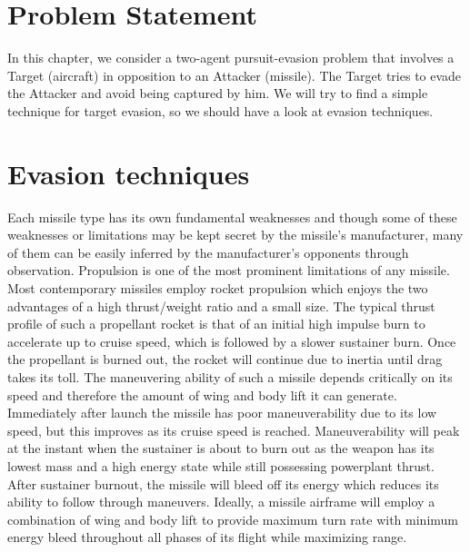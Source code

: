 \label{introTA}
\section{Problem Statement}
In this chapter, we consider a two-agent pursuit-evasion problem that involves  a Target (aircraft) in opposition to an Attacker (missile). The Target tries to evade the Attacker and avoid being captured by him. We will try to find a simple technique for target evasion, so we should have a look at evasion techniques.

\section{Evasion techniques}

Each missile type has its own fundamental weaknesses and though some of these weaknesses or limitations may be kept secret by the missile’s manufacturer, many of them can be easily inferred by the manufacturer's opponents through observation. Propulsion is one of the most prominent limitations of any missile. Most contemporary missiles employ rocket propulsion which enjoys the two advantages of a high thrust/weight ratio and a small size. The typical thrust profile of such a propellant rocket is that of an initial high impulse burn to accelerate up to cruise speed, which is followed by a slower sustainer burn. Once the propellant is burned out, the rocket will continue due to inertia until drag takes its toll. The maneuvering ability of such a missile depends critically on its speed and therefore the amount of wing and body lift it can generate. Immediately after launch the missile has poor maneuverability due to its low speed, but this improves as its cruise speed is reached. Maneuverability will peak at the instant when the sustainer is about to burn out as the weapon has its lowest mass and a high energy state while still possessing powerplant thrust. After sustainer burnout, the missile will bleed off its energy which reduces its ability to follow through maneuvers. Ideally, a missile airframe will employ a combination of wing and body lift to provide maximum turn rate with minimum energy bleed throughout all phases of its flight while maximizing range.\\

